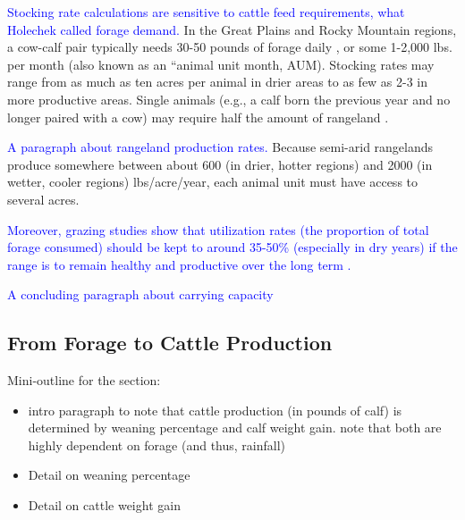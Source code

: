 \documentclass[11pt]{article}
\begin{document}
\textcolor{blue}{Stocking rate calculations are sensitive to cattle feed requirements, what Holechek called forage demand.} In the Great Plains and Rocky Mountain regions, a cow-calf pair typically needs 30-50 pounds of forage daily \citep{Cook2012}, or some 1-2,000 lbs. per month (also known as an “animal unit month, AUM).
Stocking rates may range from as much as ten acres per animal in drier areas to as few as 2-3 in more productive areas. Single animals (e.g., a calf born the previous year and no longer paired with a cow) may require half the amount of rangeland \citep{Bement1969}. 


\textcolor{blue}{A paragraph about rangeland production rates.}
Because semi-arid rangelands produce somewhere between about 600 (in drier, hotter regions) and 2000 (in wetter, cooler regions) lbs/acre/year, each animal unit must have access to several acres. 

\textcolor{blue}{Moreover, grazing studies show that utilization rates (the proportion of total forage consumed) should be kept to around 35-50\% (especially in dry years) if the range is to remain healthy and productive over the long term \citep{Holechek1999}.}

\textcolor{blue}{A concluding paragraph about carrying capacity}


\subsection{From Forage to Cattle Production}
Mini-outline for the section:
\begin{itemize}
\item intro paragraph to note that cattle production (in pounds of calf) is determined by weaning percentage and calf weight gain. note that both are highly dependent on forage (and thus, rainfall)
\item Detail on weaning percentage
\item Detail on cattle weight gain
\end{itemize}
\end{document}
